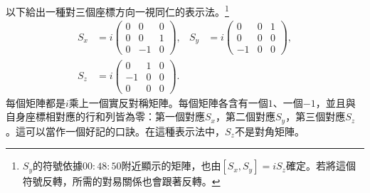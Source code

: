 以下給出一種對三個座標方向一視同仁的表示法。\footnote{\(S_y\)的符號依據\(00{:}48{:}50\)附近顯示的矩陣，也由\([S_x,S_y]=iS_z\)確定。若將這個符號反轉，所需的對易關係也會跟著反轉。}
\begin{equation}
\begin{aligned}
S_x
&=
i
\begin{pmatrix}
0&0&0\\
0&0&1\\
0&-1&0
\end{pmatrix},
&
S_y
&=
i
\begin{pmatrix}
0&0&1\\
0&0&0\\
-1&0&0
\end{pmatrix},\\
S_z
&=
i
\begin{pmatrix}
0&1&0\\
-1&0&0\\
0&0&0
\end{pmatrix}.
\end{aligned}
\end{equation}
每個矩陣都是\(i\)乘上一個實反對稱矩陣。每個矩陣各含有一個\(1\)、一個\(-1\)，並且與自身座標相對應的行和列皆為零：第一個對應\(S_x\)，第二個對應\(S_y\)，第三個對應\(S_z\)。這可以當作一個好記的口訣。在這種表示法中，\(S_z\)不是對角矩陣。

